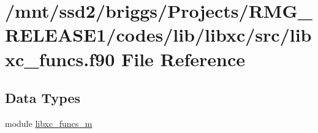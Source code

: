 \hypertarget{libxc__funcs_8f90}{\section{/mnt/ssd2/briggs/\-Projects/\-R\-M\-G\-\_\-\-R\-E\-L\-E\-A\-S\-E1/codes/lib/libxc/src/libxc\-\_\-funcs.f90 File Reference}
\label{libxc__funcs_8f90}
}
\subsection*{Data Types}
\begin{DoxyCompactItemize}
\item 
module \hyperlink{classlibxc__funcs__m}{libxc\-\_\-funcs\-\_\-m}
\end{DoxyCompactItemize}
